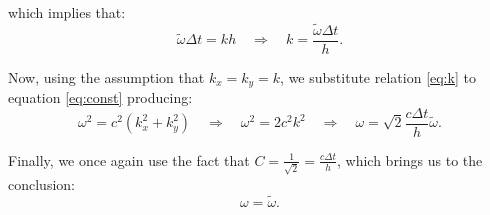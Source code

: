 \documentclass[english,notitlepage]{article}
\begin{document}
which implies that:
\begin{equation}\label{eq:k}
    \tilde{\omega}\Delta t = kh \quad \Rightarrow \quad k = \frac{\tilde{\omega}\Delta t}{h}.
\end{equation}

Now, using the assumption that $k_x = k_y = k$, we substitute relation \ref{eq:k} to equation \ref{eq:const} producing:
\begin{equation*}
    \omega^2 = c^2 \left( k_x^2 + k_y^2\right) \quad \Rightarrow \quad \omega^2 = 2c^2k^2 \quad \Rightarrow \quad \omega = \sqrt{2} \frac{c\Delta t}{h}\tilde{\omega}.
\end{equation*}

Finally, we once again use the fact that $C=\frac{1}{\sqrt{2}}=\frac{c\Delta t}{h}$, which brings us to the conclusion:
\begin{equation*}
    \omega = \tilde{\omega}.
\end{equation*}
\end{document}
